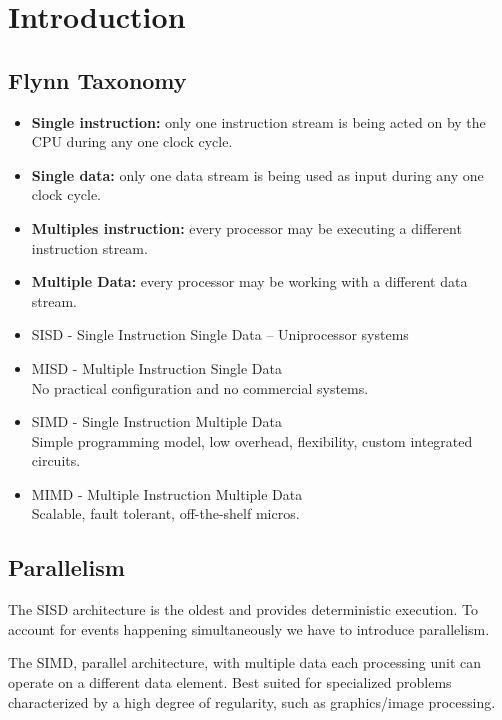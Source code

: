 
\section{Introduction}\label{sec:introduction}

\subsection{Flynn Taxonomy}\label{subsec:taxonomy}
\begin{itemize}
    \item[] \textbf{Single instruction:} only one instruction stream is being acted on by the CPU during any one clock
    cycle.
    \item[] \textbf{Single data:} only one data stream is being used as input during any one clock cycle.
    \item[] \textbf{Multiples instruction:} every processor may be executing a different instruction stream.
    \item[] \textbf{Multiple Data:} every processor may be working with a different data stream.
\end{itemize}


\begin{itemize}
    \item SISD - Single Instruction Single Data – Uniprocessor systems
    \item MISD - Multiple Instruction Single Data\\
    No practical configuration and no commercial systems.
    \item SIMD - Single Instruction Multiple Data\\
    Simple programming model, low overhead, flexibility, custom integrated circuits.
    \item MIMD - Multiple Instruction Multiple Data\\
    Scalable, fault tolerant, off-the-shelf micros.
\end{itemize}

\subsection{Parallelism}\label{subsec:parallelism}
The SISD architecture is the oldest and provides deterministic execution.
To account for events happening simultaneously we have to introduce parallelism.

The SIMD, parallel architecture, with multiple data each processing unit can operate on a different data element.
Best suited for specialized problems characterized by a high degree of regularity, such as graphics/image processing.

